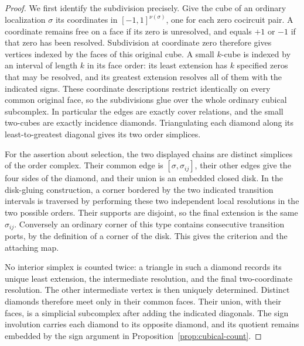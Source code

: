 \begin{proof}
We first identify the subdivision precisely. Give the cube of an ordinary
localization $\sigma$ its coordinates in $[-1,1]^{\nu(\sigma)}$, one for
each zero cocircuit pair. A coordinate remains free on a face if its
zero is unresolved, and equals $+1$ or $-1$ if that zero has been
resolved. Subdivision at coordinate zero therefore gives vertices
indexed by the faces of this original cube. A small $k$-cube is indexed
by an interval of length $k$ in its face order: its least extension has
$k$ specified zeros that may be resolved, and its greatest extension
resolves all of them with the indicated signs. These coordinate
descriptions restrict identically on every common original face, so
the subdivisions glue over the whole ordinary cubical subcomplex.
In particular the edges are exactly cover relations, and the small
two-cubes are exactly incidence diamonds. Triangulating each diamond
along its least-to-greatest diagonal gives its two order simplices.

For the assertion about selection, the two displayed chains are distinct
simplices of the order complex. Their common edge is
$[\sigma,\sigma_{ij}]$, their other edges give the four sides of the
diamond, and their union is an embedded closed disk. In the disk-gluing
construction, a corner bordered by the two indicated transition intervals
is traversed by performing these two independent local resolutions in the
two possible orders. Their supports are disjoint, so the final extension
is the same $\sigma_{ij}$. Conversely an ordinary corner of this type
contains consecutive transition ports, by the definition of a corner of
the disk. This gives the criterion and the attaching map.

No interior simplex is counted twice: a triangle in such a diamond records
its unique least extension, the intermediate resolution, and the final
two-coordinate resolution. The other intermediate vertex is then uniquely
determined. Distinct diamonds therefore meet only in their common faces.
Their union, with their faces, is a simplicial subcomplex after adding the
indicated diagonals. The sign involution carries each diamond to its
opposite diamond, and its quotient remains embedded by the sign argument
in Proposition~\ref{prop:cubical-count}.


\end{proof}
